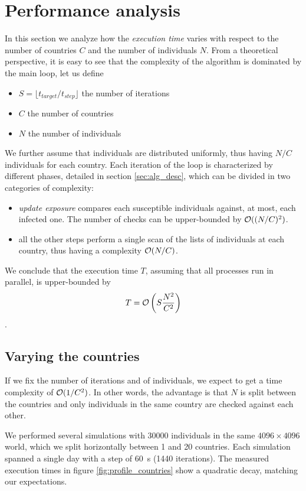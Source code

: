 \section{Performance analysis}
\label{sec:performance_analysis}

In this section we analyze how the \emph{execution time} varies with respect to the number of countries $C$ and the number of individuals $N$.
From a theoretical perspective, it is easy to see that the complexity of the algorithm is dominated by the main loop, let us define
\begin{itemize}
    \item $S = \lfloor t_{target} / t_{step} \rfloor$ the number of iterations
    \item $C$ the number of countries
    \item $N$ the number of individuals
\end{itemize}
We further assume that individuals are distributed uniformly, thus having $N/C$ individuals for each country.
Each iteration of the loop is characterized by different phases, detailed in section \ref{sec:alg_desc}, which can be divided in two categories of complexity:
\begin{itemize}
    \item \emph{update exposure} compares each susceptible individuals against, at most, each infected one. The number of checks can be upper-bounded by $\mathcal{O}((N/C)^2)$.
    \item all the other steps perform a single scan of the lists of individuals at each country, thus having a complexity $\mathcal{O}(N/C)$.
\end{itemize}
We conclude that the execution time $T$, assuming that all processes run in parallel, is upper-bounded by \[T = \mathcal{O} \left(S \frac{N^2}{C^2} \right)\].

\subsection{Varying the countries}
If we fix the number of iterations and of individuals, we expect to get a time complexity of $\mathcal{O}(1/C^2)$. In other words, the advantage is that $N$ is split between the countries and only individuals in the same country are checked against each other.

We performed several simulations with \num{30000} individuals in the same $4096 \times 4096$ world, which we split horizontally between 1 and 20 countries. Each simulation spanned a single day with a step of \SI{60}{s} (1440 iterations). The measured execution times in figure \ref{fig:profile_countries} show a quadratic decay, matching our expectations.

